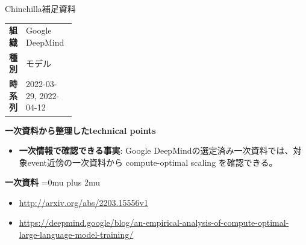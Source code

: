 \begin{technicalnote}{Chinchilla}{補足資料}
\begingroup
\begin{tabularx}{\linewidth}{@{}>{\bfseries}p{0.22\linewidth}X@{}}
組織 & Google DeepMind \\
種別 & モデル \\
時系列 & 2022-03-29, 2022-04-12 \\
\end{tabularx}
\smallskip
{\bfseries 一次資料から整理したtechnical points}
\begin{itemize}[leftmargin=1.5em,itemsep=0.35em]
\item \textbf{一次情報で確認できる事実}: Google DeepMindの選定済み一次資料では、対象event近傍の一次資料から compute-optimal scaling を確認できる。
\end{itemize}
\begin{minipage}{\linewidth}
\begin{samepage}
{\bfseries 一次資料}
\begingroup\sloppy
\Urlmuskip=0mu plus 2mu\relax
\begin{itemize}[leftmargin=1.5em,itemsep=0.25em]
\item {\scriptsize\url{http://arxiv.org/abs/2203.15556v1}}
\item {\scriptsize\url{https://deepmind.google/blog/an-empirical-analysis-of-compute-optimal-large-language-model-training/}}
\end{itemize}
\endgroup
\end{samepage}
\end{minipage}
\endgroup
\end{technicalnote}
\medskip


